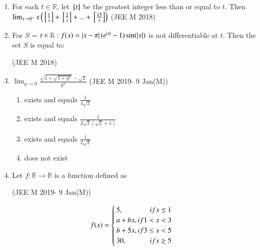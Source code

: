 \documentclass[journal]{IEEEtran}
\begin{document}
\begin{enumerate}[start=36]
\begin{enumerate}
	\end{enumerate}
\item For each $t\in\mathbb{R}$, let ${}\left[t\right]$ be the greatest integer less than or equal to $t$. Then 
	$\lim_{x\to0^+} x\left( {}\left[\frac{1}{x}\right]+{}\left[\frac{2}{x}\right]+...+{}\left[ \frac{15}{x}\right]\right) $
	\hfill{(JEE M 2018)}
	\begin{enumerate}
	\end{enumerate}
\item For $S$ =  $t\in\mathbb{R}:f(x)=\left\vert x-\pi\right\vert(e^{\left\vert x\right\vert}-1)\sin(\left\vert x\right\vert)$ is not differentiable at $t$. Then the set $S$ is equal to:

	\hfill{(JEE M 2018)}
	\begin{enumerate}
			\begin{multicols}{2}
		\item {$0$}
		\item ${\pi}$
		\item ${0,\pi}$
		\item ${\emptyset}$(an empty set)
			\end{multicols}
	\end{enumerate}
	\item  
	$\lim_{y\to0} \frac{\sqrt{1+\sqrt{1+y^4}}-\sqrt{2}}{y^4} $
	\hfill{(JEE M 2019- 9 Jan(M))}
	\begin{enumerate}
		\item exists and equals $\frac{1}{4\sqrt{2}}$
		\item exists and equals $\frac{1}{2\sqrt{2}(\sqrt{2}+1)}$
		\item exists and equals $\frac{1}{2\sqrt{2}}$
		\item does not exist
	\end{enumerate}
\item Let $f : \mathbb{R}\to\mathbb{R}$ is a function defined as

	\hfill{(JEE M 2019- 9 Jan(M))}

	\begin{equation}
	    f(x)= 
	    \begin{cases}
		    5, \hfill{if  x \leq 1} \\
			    a + bx, \hfill{if  1 < x < 3} \\
			    b + 5x, \hfill{if  3 \le x < 5} \\
			    30, \hfill{if  x \geq 5}
	    \end{cases}
	\end{equation}


\end{enumerate}
\end{document}

